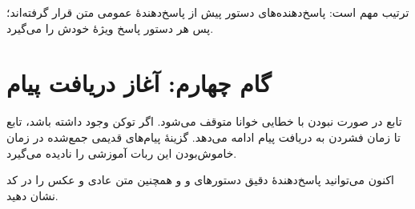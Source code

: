 ترتیب مهم است: پاسخ‌دهنده‌های دستور پیش از پاسخ‌دهندهٔ عمومی متن قرار گرفته‌اند؛
پس هر دستور پاسخ ویژهٔ خودش را می‌گیرد.

\section{گام چهارم: آغاز دریافت پیام}

تابع
در صورت نبودن
با خطایی خوانا متوقف می‌شود. اگر توکن وجود داشته باشد، تابع
تا زمان فشردن
به دریافت پیام ادامه می‌دهد. گزینهٔ
پیام‌های قدیمی جمع‌شده در زمان خاموش‌بودن این ربات آموزشی را نادیده می‌گیرد.

\begin{checkpointbox}
اکنون می‌توانید پاسخ‌دهندهٔ دقیق دستورهای
و
و همچنین متن عادی و عکس را در کد نشان دهید.
\end{checkpointbox}
